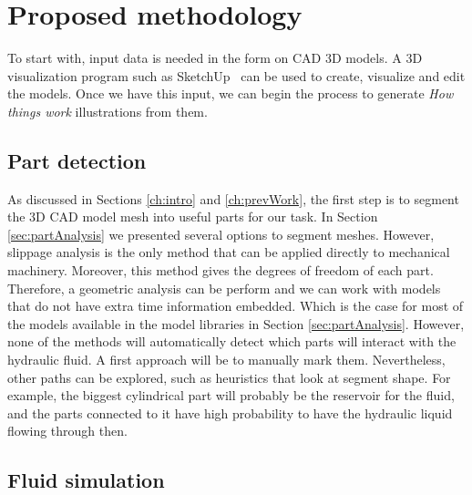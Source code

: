 \chapter{Proposed methodology}

To start with, input data is needed in the form on CAD 3D models.
A 3D visualization program such as SketchUp~\cite{Trimble2014} can be used to create, visualize and edit the models.
Once we have this input, we can begin the process to generate \textit{How things work} illustrations from them.


\section{Part detection}

As discussed in Sections \ref{ch:intro} and \ref{ch:prevWork}, the first step is to segment the 3D CAD model mesh into useful parts for our task.
In Section \ref{sec:partAnalysis} we presented several options to segment meshes.
However, slippage analysis is the only method that can be applied directly to mechanical machinery.
Moreover, this method gives the degrees of freedom of each part. Therefore, a geometric analysis can be perform and we can work with models that do not have extra time information embedded.
Which is the case for most of the models available in the model libraries in Section \ref{sec:partAnalysis}.
However, none of the methods will automatically detect which parts will interact with the hydraulic fluid.
A first approach will be to manually mark them.
Nevertheless, other paths can be explored, such as heuristics that look at segment shape.
For example, the biggest cylindrical part will probably be the reservoir for the fluid, and the parts connected to it have high probability to have the hydraulic liquid flowing through then.


\section{Fluid simulation}

